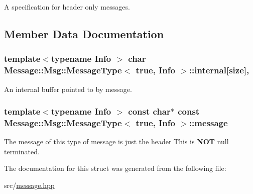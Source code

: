 A specification for header only messages. 

\subsection{Member Data Documentation}
\subsubsection[{\texorpdfstring{internal}{internal}}]{\setlength{\rightskip}{0pt plus 5cm}template$<$typename Info $>$ char {\bf Message\+::\+Msg\+::\+Message\+Type}$<$ true, Info $>$\+::internal\mbox{[}size\mbox{]}\hspace{0.3cm}{\ttfamily [static]}, {\ttfamily [private]}}\hypertarget{struct_message_1_1_msg_1_1_message_type_3_01true_00_01_info_01_4_ac84b1b4f1d2d30f0dbf5689ddc471955}{}\label{struct_message_1_1_msg_1_1_message_type_3_01true_00_01_info_01_4_ac84b1b4f1d2d30f0dbf5689ddc471955}


An internal buffer pointed to by message. 

\subsubsection[{\texorpdfstring{message}{message}}]{\setlength{\rightskip}{0pt plus 5cm}template$<$typename Info $>$ const char$\ast$ const {\bf Message\+::\+Msg\+::\+Message\+Type}$<$ true, Info $>$\+::message\hspace{0.3cm}{\ttfamily [static]}}\hypertarget{struct_message_1_1_msg_1_1_message_type_3_01true_00_01_info_01_4_af95de5744fd55ef53ddc12587b4be239}{}\label{struct_message_1_1_msg_1_1_message_type_3_01true_00_01_info_01_4_af95de5744fd55ef53ddc12587b4be239}


The message of this type of message is just the header This is {\bfseries N\+OT} null terminated. 



The documentation for this struct was generated from the following file\+:\begin{DoxyCompactItemize}
\item 
src/\hyperlink{message_8hpp}{message.\+hpp}\end{DoxyCompactItemize}
